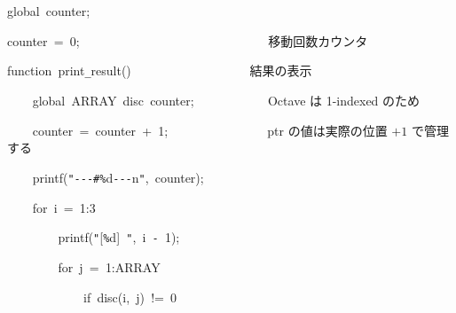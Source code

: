 \documentclass[a4paper,10pt]{article}
\def\mc{\relax}
\begin{document}
\noindent
\mbox{}global{\tt\mc \ }counter;

\noindent
\mbox{}counter{\tt\mc \ }={\tt\mc \ }0;{\tt\mc \ }{\tt\mc \ }{\tt\mc \ }{\tt\mc \ }{\tt\mc \ }{\tt\mc \ }{\tt\mc \ }{\tt\mc \ }{\tt\mc \ }{\tt\mc \ }{\tt\mc \ }{\tt\mc \ }{\tt\mc \ }{\tt\mc \ }{\tt\mc \ }{\tt\mc \ }{\tt\mc \ }{\tt\mc \ }{\tt\mc \ }{\tt\mc \ }{\tt\mc \ }{\tt\mc \ }{\tt\mc \ }{\tt\mc \ }{\tt\mc \ }{\tt\mc \ }{\tt\mc \ }{\tt\mc \ }\rm\mc {\tt\%} \ 移動回数カウンタ \hfill
\tt\mc 

\noindent
\mbox{}\hfill

\noindent
\mbox{}function{\tt\mc \ }print{\tt\_}result(){\tt\mc \ }{\tt\mc \ }{\tt\mc \ }{\tt\mc \ }{\tt\mc \ }{\tt\mc \ }{\tt\mc \ }{\tt\mc \ }{\tt\mc \ }{\tt\mc \ }{\tt\mc \ }{\tt\mc \ }{\tt\mc \ }{\tt\mc \ }{\tt\mc \ }{\tt\mc \ }{\tt\mc \ }\rm\mc {\tt\%} \ 結果の表示 \hfill
\tt\mc 

\noindent
\mbox{}{\tt\mc \ }{\tt\mc \ }{\tt\mc \ }{\tt\mc \ }global{\tt\mc \ }ARRAY{\tt\mc \ }disc{\tt\mc \ }counter;{\tt\mc \ }{\tt\mc \ }{\tt\mc \ }{\tt\mc \ }{\tt\mc \ }{\tt\mc \ }{\tt\mc \ }{\tt\mc \ }{\tt\mc \ }{\tt\mc \ }\rm\mc {\tt\%} \ Octave は 1-indexed のため\hfill
\tt\mc 

\noindent
\mbox{}{\tt\mc \ }{\tt\mc \ }{\tt\mc \ }{\tt\mc \ }counter{\tt\mc \ }={\tt\mc \ }counter{\tt\mc \ }+{\tt\mc \ }1;{\tt\mc \ }{\tt\mc \ }{\tt\mc \ }{\tt\mc \ }{\tt\mc \ }{\tt\mc \ }{\tt\mc \ }{\tt\mc \ }{\tt\mc \ }{\tt\mc \ }{\tt\mc \ }{\tt\mc \ }{\tt\mc \ }{\tt\mc \ }\rm\mc {\tt\%} \ ptr の値は実際の位置 $+1$ で管理する\hfill
\tt\mc 

\noindent
\mbox{}{\tt\mc \ }{\tt\mc \ }{\tt\mc \ }{\tt\mc \ }printf({\tt "}{\tt -}{\tt -}{\tt -}{\tt\#}{\tt\%}d{\tt -}{\tt -}{\tt -}{\tt{}}n{\tt "},{\tt\mc \ }counter);

\noindent
\mbox{}{\tt\mc \ }{\tt\mc \ }{\tt\mc \ }{\tt\mc \ }for{\tt\mc \ }i{\tt\mc \ }={\tt\mc \ }1:3

\noindent
\mbox{}{\tt\mc \ }{\tt\mc \ }{\tt\mc \ }{\tt\mc \ }{\tt\mc \ }{\tt\mc \ }{\tt\mc \ }{\tt\mc \ }printf({\tt "}[{\tt\%}d]{\tt\mc \ }{\tt "},{\tt\mc \ }i{\tt\mc \ }{\tt -}{\tt\mc \ }1);

\noindent
\mbox{}{\tt\mc \ }{\tt\mc \ }{\tt\mc \ }{\tt\mc \ }{\tt\mc \ }{\tt\mc \ }{\tt\mc \ }{\tt\mc \ }for{\tt\mc \ }j{\tt\mc \ }={\tt\mc \ }1:ARRAY

\noindent
\mbox{}{\tt\mc \ }{\tt\mc \ }{\tt\mc \ }{\tt\mc \ }{\tt\mc \ }{\tt\mc \ }{\tt\mc \ }{\tt\mc \ }{\tt\mc \ }{\tt\mc \ }{\tt\mc \ }{\tt\mc \ }if{\tt\mc \ }disc(i,{\tt\mc \ }j){\tt\mc \ }!={\tt\mc \ }0
\end{document}

